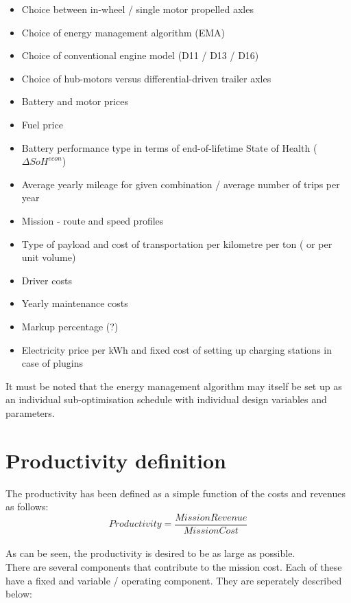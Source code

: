 \documentclass[ExampleMasters.tex]{subfiles}
\begin{document}
		\begin{itemize}
		\item Choice between in-wheel / single motor propelled axles
		\item Choice of energy management algorithm (EMA)
		\item Choice of conventional engine model (D11 / D13 / D16)
		\item Choice of hub-motors versus differential-driven trailer axles
		\item Battery and motor prices
		\item Fuel price
		\item Battery performance type in terms of end-of-lifetime State of Health ($\Delta SoH^{econ}$)
		\item Average yearly mileage for given combination / average number of trips per year
		\item Mission - route and speed profiles
		\item Type of payload and cost of transportation per kilometre per ton ( or per unit volume)
		\item Driver costs
		\item Yearly maintenance costs
		\item Markup percentage (?)
		\item Electricity price per kWh and fixed cost of setting up charging stations in case of plugins
		\end{itemize}

		It must be noted that the energy management algorithm may itself be set up as an individual sub-optimisation schedule with individual design variables and parameters.

	\section{Productivity definition}

		The productivity has been defined as a simple function of the costs and revenues as follows:\\

		\begin{equation}
			Productivity = \frac{Mission Revenue}{Mission Cost}
		\end{equation}\\

		As can be seen, the productivity is desired to be as large as possible.\\

		There are several components that contribute to the mission cost. Each of these have a fixed and variable / operating component. They are seperately described below:\\
\end{document}

